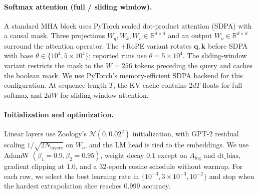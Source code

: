 \documentclass{article}
\newcommand{\1}{\bm{1}}
\def\vk{{\bm{k}}}
\def\vq{{\bm{q}}}
\newcommand{\R}{\mathbb{R}}
\newcommand{\seql}{T}
\theoremstyle{definition}
\begin{document}
\paragraph{Softmax attention (full / sliding window).} A standard MHA block uses PyTorch
scaled dot-product attention (SDPA) with a causal mask. Three projections
$W_q,W_k,W_v\in\R^{d\times d}$ and an output $W_o\in\R^{d\times d}$ surround the attention
operator. The $+\!$RoPE variant rotates $\vq,\vk$ before SDPA with base
$\theta\in\{10^4,5\!\times\!10^4\}$; reported runs use $\theta=5\!\times\!10^4$. The
sliding-window variant restricts the mask to the $W=256$ tokens preceding the query and caches the
boolean mask. We use PyTorch's memory-efficient SDPA backend for this configuration. At sequence length $\seql$, the
KV cache contains $2d\seql$ floats for full softmax and $2dW$ for sliding-window attention.

\enlargethispage{2\baselineskip}
\paragraph{Initialization and optimization.}
Linear layers use Zoology's $\mathcal{N}(0,0.02^2)$ initialization, with GPT-2 residual scaling
$1/\sqrt{2N_\text{layers}}$ on $W_o$, and the LM head is tied to the embeddings. We use AdamW
$(\beta_1=0.9,\beta_2=0.95)$, weight decay $0.1$ except on $A_\text{log}$ and
$\mathrm{dt\_bias}$, gradient clipping at $1.0$, and a $32$-epoch cosine schedule without warmup.
For each row, we select the best learning rate in
$\{10^{-3},3\!\times\!10^{-3},10^{-2}\}$ and stop when the hardest extrapolation slice reaches
$0.999$ accuracy.
\end{document}
